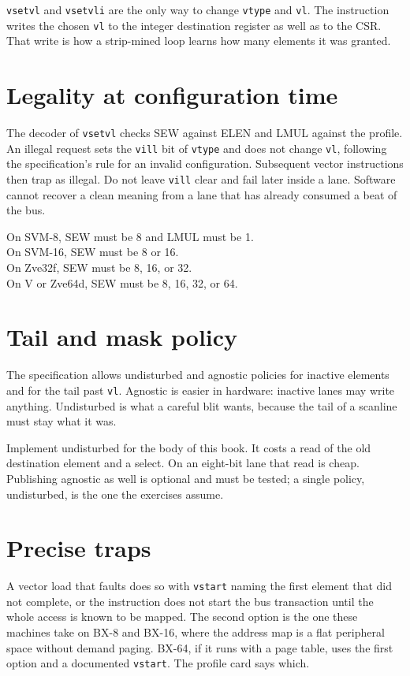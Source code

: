 \texttt{vsetvl} and \texttt{vsetvli} are the only way to change \texttt{vtype} and \texttt{vl}. The instruction writes the chosen \texttt{vl} to the integer destination register as well as to the CSR. That write is how a strip-mined loop learns how many elements it was granted.

\section{Legality at configuration time}

The decoder of \texttt{vsetvl} checks SEW against ELEN and LMUL against the profile. An illegal request sets the \texttt{vill} bit of \texttt{vtype} and does not change \texttt{vl}, following the specification's rule for an invalid configuration. Subsequent vector instructions then trap as illegal. Do not leave \texttt{vill} clear and fail later inside a lane. Software cannot recover a clean meaning from a lane that has already consumed a beat of the bus.

\begin{spec}
On SVM-8, SEW must be 8 and LMUL must be 1.\\
On SVM-16, SEW must be 8 or 16.\\
On Zve32f, SEW must be 8, 16, or 32.\\
On V or Zve64d, SEW must be 8, 16, 32, or 64.
\end{spec}

\section{Tail and mask policy}

The specification allows undisturbed and agnostic policies for inactive elements and for the tail past \texttt{vl}. Agnostic is easier in hardware: inactive lanes may write anything. Undisturbed is what a careful blit wants, because the tail of a scanline must stay what it was.

Implement undisturbed for the body of this book. It costs a read of the old destination element and a select. On an eight-bit lane that read is cheap. Publishing agnostic as well is optional and must be tested; a single policy, undisturbed, is the one the exercises assume.

\section{Precise traps}

A vector load that faults does so with \texttt{vstart} naming the first element that did not complete, or the instruction does not start the bus transaction until the whole access is known to be mapped. The second option is the one these machines take on BX-8 and BX-16, where the address map is a flat peripheral space without demand paging. BX-64, if it runs with a page table, uses the first option and a documented \texttt{vstart}. The profile card says which.
